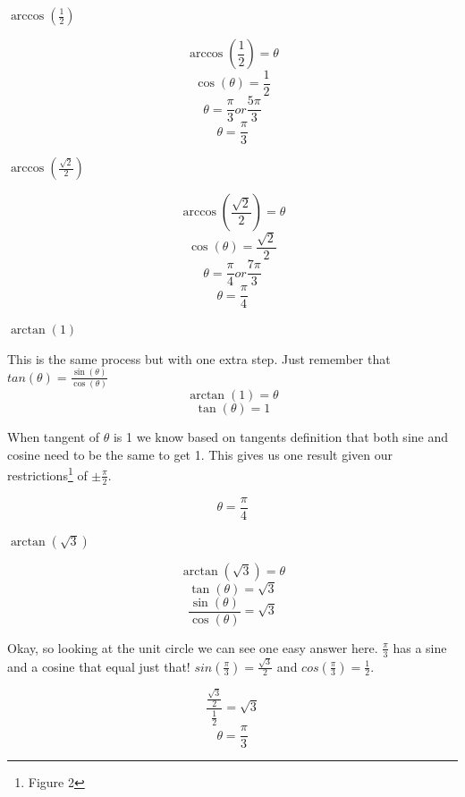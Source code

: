 \documentclass[10pt,letterpaper]{amspset}
\begin{document}
\pagebreak


\begin{problem}[15]
    $\arccos(\frac{1}{2})$
\end{problem}

\begin{solution}
    \[ \arccos(\frac{1}{2}) = \theta \]
    \[ \cos(\theta) = \frac{1}{2}\]
    \[ \theta = \frac{\pi}{3} or \frac{5\pi}{3}\]
    \[ \boxed{ \theta = \frac{\pi}{3} }\]
\end{solution}


\begin{problem}[16]
    $\arccos(\frac{\sqrt{2}}{2})$
\end{problem}

\begin{solution}
    \[ \arccos(\frac{\sqrt{2}}{2}) = \theta \]
    \[ \cos(\theta) = \frac{\sqrt{2}}{2}\]
    \[ \theta = \frac{\pi}{4} or \frac{7\pi}{3}\]
    \[ \boxed{ \theta = \frac{\pi}{4} }\]
\end{solution}


\begin{problem}[24]
    $\arctan(1)$
\end{problem}

\begin{solution}
    This is the same process but with one extra step. Just remember that $tan(\theta) = \frac{\sin(\theta)}{\cos(\theta)}$ 
    \[ \arctan(1) = \theta \]
    \[ \tan(\theta) = 1\]
    
    When tangent of $\theta$ is 1 we know based on tangents definition that both sine and cosine need to be the same to get 1. This gives us one result given our restrictions\footnote{Figure 2} of $\pm \frac{\pi}{2}$. 
    
    \[ \boxed{ \theta = \frac{\pi}{4} }\]
\end{solution}


\pagebreak


\begin{problem}[25]
    $\arctan(\sqrt{3})$
\end{problem}

\begin{solution}
    \[ \arctan(\sqrt{3}) = \theta \]
    \[ \tan(\theta) = \sqrt{3}\]
    \[ \frac{\sin(\theta)}{\cos(\theta)} = \sqrt{3} \]
    
    Okay, so looking at the unit circle we can see one easy answer here. $\frac{\pi}{3}$ has a sine and a cosine that equal just that! $sin(\frac{\pi}{3}) = \frac{\sqrt{3}}{2}$ and $cos(\frac{\pi}{3}) = \frac{1}{2}$.
    
    \[ \frac{ \frac{\sqrt{3}}{2} } { \frac{1}{2} } = \sqrt{3} \]
    \[\boxed{ \theta = \frac{\pi}{3} } \]
\end{solution}
\end{document}
